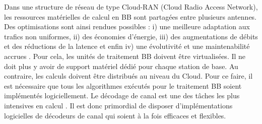 Dans une structure de réseau de type Cloud-RAN (Cloud Radio Access Network), les ressources matérielles de calcul en BB sont partagées entre plusieurs antennes. Des optimisations sont ainsi rendues possibles : i) une meilleure adaptation aux trafics non uniformes, ii) des économies d'énergie, iii) des augmentations de débits et des réductions de la latence et enfin iv) une évolutivité et une maintenabilité accrues \cite{checko_cloud_2015}. Pour cela, les unités de traitement BB doivent être virtualisées. Il ne doit plus y avoir de support matériel dédié pour chaque station de base. Au contraire, les calculs doivent être distribués au niveau du Cloud. Pour ce faire, il est nécessaire que tous les algorithmes exécutés pour le traitement BB soient implémentés logiciellement. Le décodage de canal est une des tâches les plus intensives en calcul \cite{rodriguez_towards_2017,nikaein_processing_2015}. Il est donc primordial de disposer d'implémentations logicielles de décodeurs de canal qui soient à la fois efficaces et flexibles.

